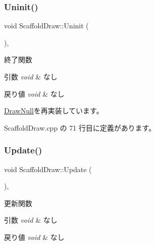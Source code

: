 \subsubsection{\texorpdfstring{Uninit()}{Uninit()}}
{\footnotesize\ttfamily void Scaffold\+Draw\+::\+Uninit (\begin{DoxyParamCaption}{ }\end{DoxyParamCaption})\hspace{0.3cm}{\ttfamily [override]}, {\ttfamily [virtual]}}



終了関数 


\begin{DoxyParams}{引数}
{\em void} & なし \\
\hline
\end{DoxyParams}

\begin{DoxyRetVals}{戻り値}
{\em void} & なし \\
\hline
\end{DoxyRetVals}


\mbox{\hyperlink{class_draw_null_a6e81d63efab7333e8d0e8af99362a4d9}{Draw\+Null}}を再実装しています。



 Scaffold\+Draw.\+cpp の 71 行目に定義があります。

\mbox{\label{class_scaffold_draw_a62c2bb223525c9ab3e9eff4c2705d377}} 
\subsubsection{\texorpdfstring{Update()}{Update()}}
{\footnotesize\ttfamily void Scaffold\+Draw\+::\+Update (\begin{DoxyParamCaption}{ }\end{DoxyParamCaption})\hspace{0.3cm}{\ttfamily [override]}, {\ttfamily [virtual]}}



更新関数 


\begin{DoxyParams}{引数}
{\em void} & なし \\
\hline
\end{DoxyParams}

\begin{DoxyRetVals}{戻り値}
{\em void} & なし \\
\hline
\end{DoxyRetVals}



